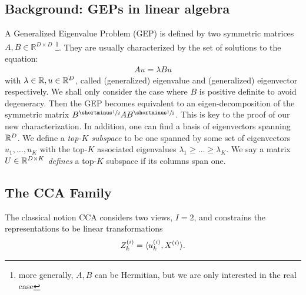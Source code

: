 \subsection{Background: GEPs in linear algebra}
A Generalized Eigenvalue Problem (GEP) is defined by two symmetric matrices $A,B\in \mathbb{R}^{D\times D}$ \citep{stewart_matrix_1990}\footnote{more generally, $A,B$ can be Hermitian, but we are only interested in the real case}. They are usually characterized by the set of solutions to the equation:
\begin{align}\label{eq:igep}
Au=\lambda Bu
\end{align}
with $\lambda \in \mathbb{R}, u \in \mathbb{R}^D$, called (generalized) eigenvalue and (generalized) eigenvector respectively. We shall only consider the case where $B$ is positive definite to avoid degeneracy.
Then the GEP becomes equivalent to an eigen-decomposition of the symmetric matrix $B^\mhalf A B^\mhalf$. This is key to the proof of our new characterization.
In addition, one can find a basis of eigenvectors spanning $\mathbb{R}^D$.
We define a \textit{top-$K$ subspace} to be one spanned by some set of eigenvectors {$u_1,\dots,u_K$} with the top-$K$ associated eigenvalues $\lambda_1 \geq \dots \geq \lambda_K$.
We say a matrix $U \in \mathbb{R}^{D \times K}$ \textit{defines} a top-$K$ subspace if its columns span one.



\subsection{The CCA Family}\label{sec:CCA-family}
The classical notion CCA \citep{hotelling1992relations} considers two views, $I=2$, and constrains the representations to be linear transformations
\begin{equation}\label{eq:cca-linear-function-def}
    Z^{(i)}_k = \langle u_k^{(i)} , X^{(i)} \rangle.
\end{equation}

